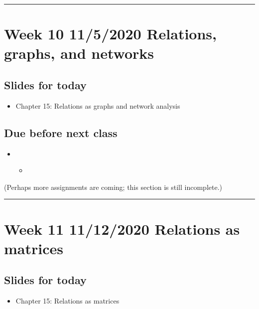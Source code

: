 \documentclass[letterpaper,10pt,english]{sphinxmanual}
\begin{document}
\bigskip\hrule\bigskip



\section{Week 10 \sphinxhyphen{} 11/5/2020 \sphinxhyphen{} Relations, graphs, and networks}
\label{\detokenize{course-schedule:week-10-11-5-2020-relations-graphs-and-networks}}

\subsection{Slides for today}
\label{\detokenize{course-schedule:id17}}\begin{itemize}
\item {} 
Chapter 15: Relations as graphs and network analysis

\end{itemize}


\subsection{Due before next class}
\label{\detokenize{course-schedule:id18}}\begin{itemize}
\item {} 
\begin{itemize}
\item {} 
{\hyperref[\detokenize{chapter-16-matrices::doc}]{}}

\end{itemize}

\end{itemize}

(Perhaps more assignments are coming; this section is still incomplete.)


\bigskip\hrule\bigskip



\section{Week 11 \sphinxhyphen{} 11/12/2020 \sphinxhyphen{} Relations as matrices}
\label{\detokenize{course-schedule:week-11-11-12-2020-relations-as-matrices}}

\subsection{Slides for today}
\label{\detokenize{course-schedule:id19}}\begin{itemize}
\item {} 
Chapter 15: Relations as matrices

\end{itemize}
\end{document}
